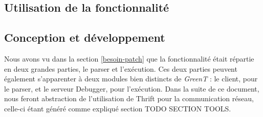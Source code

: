 	\subsection{Utilisation de la fonctionnalité}\label{usePatch}
	
	\subsection{Conception et développement}
	Nous avons vu dans la section \ref{besoin-patch} que la fonctionnalité était répartie en deux grandes parties, le parser et l'exécution. Ces deux parties peuvent également s'apparenter à deux modules bien distincts de \textit{GreenT} : le client, pour le parser, et le serveur Debugger, pour l'exécution. Dans la suite de ce document, nous feront abstraction de l'utilisation de Thrift pour la communication réseau, celle-ci étant généré comme expliqué section TODO SECTION TOOLS.
	
